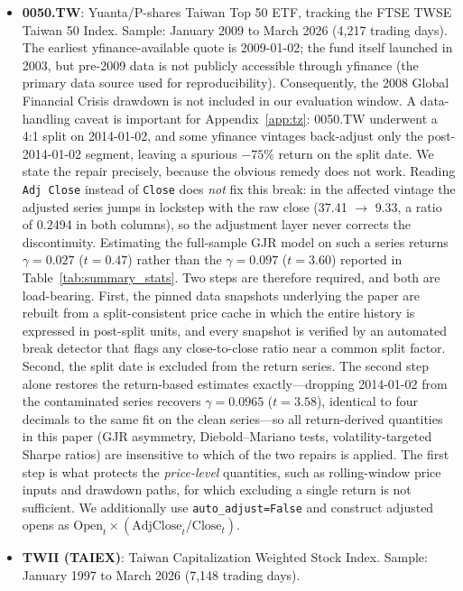 \begin{itemize}
    \item \textbf{0050.TW}: Yuanta/P-shares Taiwan Top 50 ETF, tracking the FTSE TWSE Taiwan 50 Index. Sample: January 2009 to March 2026 (4,217 trading days). The earliest yfinance-available quote is 2009-01-02; the fund itself launched in 2003, but pre-2009 data is not publicly accessible through yfinance (the primary data source used for reproducibility). Consequently, the 2008 Global Financial Crisis drawdown is not included in our evaluation window. A data-handling caveat is important for Appendix~\ref{app:tz}: 0050.TW underwent a 4:1 split on 2014-01-02, and some yfinance vintages back-adjust only the post-2014-01-02 segment, leaving a spurious $-75\%$ return on the split date. We state the repair precisely, because the obvious remedy does not work. Reading \texttt{Adj Close} instead of \texttt{Close} does \emph{not} fix this break: in the affected vintage the adjusted series jumps in lockstep with the raw close (37.41 $\to$ 9.33, a ratio of 0.2494 in both columns), so the adjustment layer never corrects the discontinuity. Estimating the full-sample GJR model on such a series returns $\gamma = 0.027$ ($t = 0.47$) rather than the $\gamma = 0.097$ ($t = 3.60$) reported in Table~\ref{tab:summary_stats}. Two steps are therefore required, and both are load-bearing. First, the pinned data snapshots underlying the paper are rebuilt from a split-consistent price cache in which the entire history is expressed in post-split units, and every snapshot is verified by an automated break detector that flags any close-to-close ratio near a common split factor. Second, the split date is excluded from the return series. The second step alone restores the return-based estimates exactly---dropping 2014-01-02 from the contaminated series recovers $\gamma = 0.0965$ ($t = 3.58$), identical to four decimals to the same fit on the clean series---so all return-derived quantities in this paper (GJR asymmetry, Diebold--Mariano tests, volatility-targeted Sharpe ratios) are insensitive to which of the two repairs is applied. The first step is what protects the \emph{price-level} quantities, such as rolling-window price inputs and drawdown paths, for which excluding a single return is not sufficient. We additionally use \texttt{auto\_adjust=False} and construct adjusted opens as $\text{Open}_t \times (\text{AdjClose}_t/\text{Close}_t)$.
    \item \textbf{TWII (TAIEX)}: Taiwan Capitalization Weighted Stock Index. Sample: January 1997 to March 2026 (7,148 trading days).

\end{itemize}
